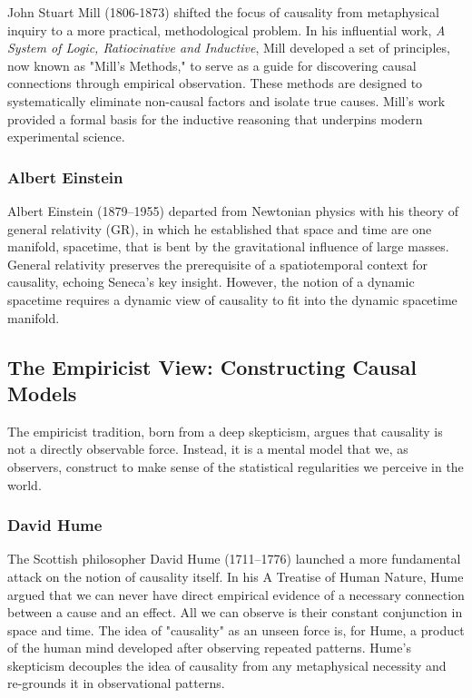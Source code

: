 John Stuart Mill (1806-1873) shifted the focus of causality from metaphysical inquiry to a more practical, methodological problem. In his influential work, \textit{A System of Logic, Ratiocinative and Inductive}\cite{mill2023system}, Mill developed a set of principles, now known as "Mill's Methods," to serve as a guide for discovering causal connections through empirical observation. These methods are designed to systematically eliminate non-causal factors and isolate true causes. Mill's work provided a formal basis for the inductive reasoning that underpins modern experimental science.


\subsubsection{Albert Einstein}
\label{sec:history_einstein}

Albert Einstein (1879--1955) departed from Newtonian physics with his theory of general relativity\cite{EinsteinPapers1915} (GR), in which he established that space and time are one manifold, spacetime, that is bent by the gravitational influence of large masses. General relativity preserves the prerequisite of a spatiotemporal context for causality, echoing Seneca's key insight. However, the notion of a dynamic spacetime requires a dynamic view of causality to fit into the dynamic spacetime manifold.

\subsection{The Empiricist View: Constructing Causal Models}
\label{ssec:philosophy_empiricist}

The empiricist tradition, born from a deep skepticism, argues that causality is not a directly observable force. Instead, it is a mental model that we, as observers, construct to make sense of the statistical regularities we perceive in the world.


\subsubsection{David Hume}
\label{sec:history_hume}

The Scottish philosopher David Hume (1711–1776) launched a more fundamental attack on the notion of causality itself. In his A Treatise of Human Nature\cite{hume2000treatise}, Hume argued that we can never have direct empirical evidence of a necessary connection between a cause and an effect. All we can observe is their constant conjunction in space and time. The idea of "causality" as an unseen force is, for Hume, a product of the human mind developed after observing repeated patterns. Hume's skepticism decouples the idea of causality from any metaphysical necessity and re-grounds it in observational patterns\cite{hume2000treatise}.


